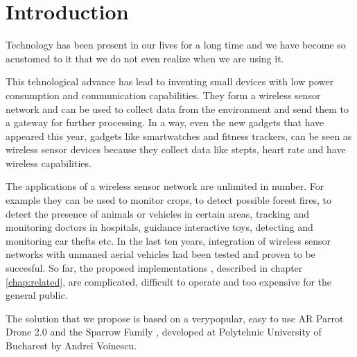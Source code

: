 \normalfont\normalsize
\chapter{Introduction}

Technology has been present in our lives for a long time and we have become so acustomed to it that we do not even realize when we are using it.

This tehnological advance has lead to inventing small devices with low power consumption and communication capabilities. They form a wireless sensor network and can be used to collect data from the environment and send them to a gateway for further processing. In a way, even the new gadgets that have appeared this year, gadgets like smartwatches and fitness trackers, can be seen as wireless sensor devices because they collect data like stepts, heart rate and have wireless capabilities.

The applications of a wireless sensor network are unlimited in number. For example they can be used to monitor crops, to detect possible forest fires, to detect the presence of animals or vehicles in certain areas, tracking and monitoring doctors in hospitals, guidance interactive toys, detecting and monitoring car thefts etc. In the last ten years, integration of wireless sensor networks with unmaned aerial vehicles had been tested and proven to be succesful. So far, the proposed implementations , described in chapter \ref{chap:related}, are complicated, difficult to operate and too expensive for the general public.

The solution that we propose is based on a verypopular, easy to use AR Parrot Drone 2.0 and the Sparrow Family \cite{voinescu2013lightweight}, developed at Polytehnic University of Bucharest by Andrei Voinescu.
